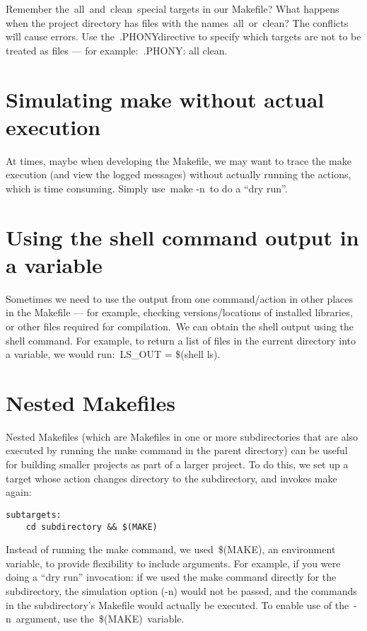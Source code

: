 \documentclass[output=paper, 
colorlinks,
citecolor=brown,
newtxmath
]{langscibook}
\begin{document}
Remember the all and clean special targets in our Makefile? What happens when the project directory has files with the names all or clean? The conflicts will cause errors. Use the .PHONYdirective to specify which targets are not to be treated as files — for example: .PHONY: all clean.

\section {Simulating make without actual execution}

At times, maybe when developing the Makefile, we may want to trace the make execution (and view the logged messages) without actually running the actions, which is time consuming. Simply use make -n to do a “dry run”.

\section {Using the shell command output in a variable}

Sometimes we need to use the output from one command/action in other places in the Makefile — for example, checking versions/locations of installed libraries, or other files required for compilation. We can obtain the shell output using the shell command. For example, to return a list of files in the current directory into a variable, we would run: LS\_OUT = \$(shell ls).

\section {Nested Makefiles}

Nested Makefiles (which are Makefiles in one or more subdirectories that are also executed by running the make command in the parent directory) can be useful for building smaller projects as part of a larger project. To do this, we set up a target whose action changes directory to the subdirectory, and invokes make again:

\begin{verbatim}
subtargets:
    cd subdirectory && $(MAKE)
\end{verbatim}

Instead of running the make command, we used \$(MAKE), an environment variable, to provide flexibility to include arguments. For example, if you were doing a “dry run” invocation: if we used the make command directly for the subdirectory, the simulation option (-n) would not be passed, and the commands in the subdirectory’s Makefile would actually be executed. To enable use of the -n argument, use the \$(MAKE) variable.
\end{document}
